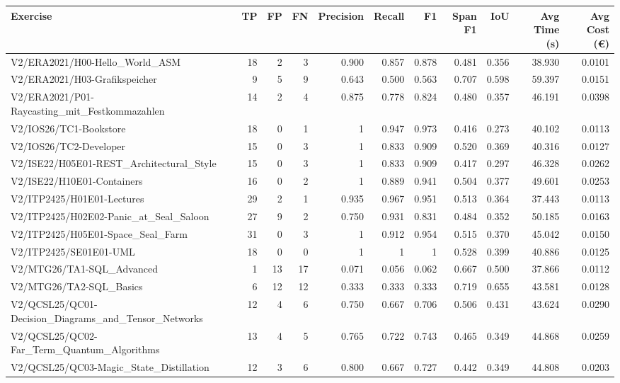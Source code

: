\begin{tabular}{lrrrrrrrrrr}
Exercise & TP & FP & FN & Precision & Recall & F1 & Span F1 & IoU & Avg Time (s) & Avg Cost (€) \\
\hline
V2/ERA2021/H00-Hello\_World\_ASM & 18 & 2 & 3 & 0.900 & 0.857 & 0.878 & 0.481 & 0.356 & 38.930 & 0.0101 \\
V2/ERA2021/H03-Grafikspeicher & 9 & 5 & 9 & 0.643 & 0.500 & 0.563 & 0.707 & 0.598 & 59.397 & 0.0151 \\
V2/ERA2021/P01-Raycasting\_mit\_Festkommazahlen & 14 & 2 & 4 & 0.875 & 0.778 & 0.824 & 0.480 & 0.357 & 46.191 & 0.0398 \\
V2/IOS26/TC1-Bookstore & 18 & 0 & 1 & 1 & 0.947 & 0.973 & 0.416 & 0.273 & 40.102 & 0.0113 \\
V2/IOS26/TC2-Developer & 15 & 0 & 3 & 1 & 0.833 & 0.909 & 0.520 & 0.369 & 40.316 & 0.0127 \\
V2/ISE22/H05E01-REST\_Architectural\_Style & 15 & 0 & 3 & 1 & 0.833 & 0.909 & 0.417 & 0.297 & 46.328 & 0.0262 \\
V2/ISE22/H10E01-Containers & 16 & 0 & 2 & 1 & 0.889 & 0.941 & 0.504 & 0.377 & 49.601 & 0.0253 \\
V2/ITP2425/H01E01-Lectures & 29 & 2 & 1 & 0.935 & 0.967 & 0.951 & 0.513 & 0.364 & 37.443 & 0.0113 \\
V2/ITP2425/H02E02-Panic\_at\_Seal\_Saloon & 27 & 9 & 2 & 0.750 & 0.931 & 0.831 & 0.484 & 0.352 & 50.185 & 0.0163 \\
V2/ITP2425/H05E01-Space\_Seal\_Farm & 31 & 0 & 3 & 1 & 0.912 & 0.954 & 0.515 & 0.370 & 45.042 & 0.0150 \\
V2/ITP2425/SE01E01-UML & 18 & 0 & 0 & 1 & 1 & 1 & 0.528 & 0.399 & 40.886 & 0.0125 \\
V2/MTG26/TA1-SQL\_Advanced & 1 & 13 & 17 & 0.071 & 0.056 & 0.062 & 0.667 & 0.500 & 37.866 & 0.0112 \\
V2/MTG26/TA2-SQL\_Basics & 6 & 12 & 12 & 0.333 & 0.333 & 0.333 & 0.719 & 0.655 & 43.581 & 0.0128 \\
V2/QCSL25/QC01-Decision\_Diagrams\_and\_Tensor\_Networks & 12 & 4 & 6 & 0.750 & 0.667 & 0.706 & 0.506 & 0.431 & 43.624 & 0.0290 \\
V2/QCSL25/QC02-Far\_Term\_Quantum\_Algorithms & 13 & 4 & 5 & 0.765 & 0.722 & 0.743 & 0.465 & 0.349 & 44.868 & 0.0259 \\
V2/QCSL25/QC03-Magic\_State\_Distillation & 12 & 3 & 6 & 0.800 & 0.667 & 0.727 & 0.442 & 0.349 & 44.808 & 0.0203 \\
\end{tabular}
